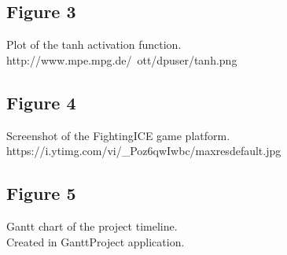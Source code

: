 \documentclass[12pt,a4paper]{article}
\begin{document}
\subsection*{Figure 3}
Plot of the tanh activation function.\\
http://www.mpe.mpg.de/~ott/dpuser/tanh.png
\subsection*{Figure 4}
Screenshot of the FightingICE game platform.\\
https://i.ytimg.com/vi/\_Poz6qwIwbc/maxresdefault.jpg
\subsection*{Figure 5}
Gantt chart of the project timeline.\\
Created in GanttProject application.
\newpage
\end{document}
